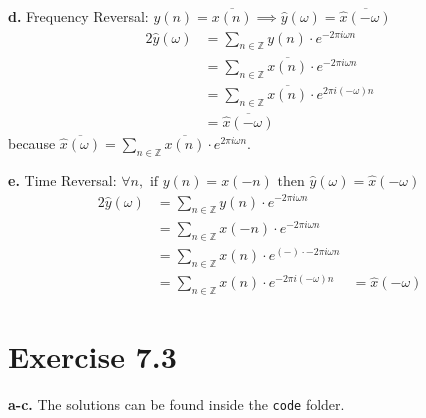 \documentclass[12pt]{article}
\newcommand{\inte}{\mathbb{Z}}
\newcommand{\een}{\ensuremath{e^{-2\pi i \omega n}}}
\begin{document}
	
	\textbf{d.} Frequency Reversal: $y(n) = \overline{x(n)} \implies \hat{y}(\omega) = \overline{\hat{x}(-\omega)}$
	\begin{alignat*}{2}
		\hat{y}(\omega) &= \sum_{n \in \inte} y(n) \cdot \een\\
		&= \sum_{n \in \inte} \overline{x(n)} \cdot \een\\
		&= \sum_{n \in \inte} \overline{x(n)} \cdot e^{2\pi i (-\omega) n}\\
		&= \overline{\hat{x}(-\omega)}
	\end{alignat*}
	because $\overline{\hat{x}(\omega)} = \sum_{n \in \inte} \overline{x(n)} \cdot e^{2\pi i \omega n}$.
	
	
	\textbf{e.} Time Reversal: $ \forall n, \text{ if } y(n) = x(-n) \text{ then } \hat{y}(\omega) = \hat{x}(-\omega)$
	\begin{alignat*}{2}
		\hat{y}(\omega) &= \sum_{n \in \inte} y(n) \cdot \een\\
		&= \sum_{n \in \inte} x(-n) \cdot \een\\
		&= \sum_{n \in \inte} x(n) \cdot e^{(-) \cdot -2\pi i \omega n}\\
		&= \sum_{n \in \inte} x(n) \cdot e^{-2\pi i (-\omega) n}
		&= \hat{x}(-\omega)
	\end{alignat*}
	\section*{Exercise 7.3}
	\textbf{a-c.} The solutions can be found inside the \texttt{code} folder.
\end{document}
